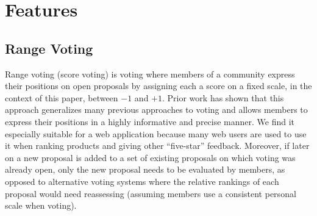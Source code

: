 \documentclass{sigchi}
\begin{document}
%
%
%
%
%

\section{Features}

\subsection{Range Voting}

Range voting (score voting) is voting where members of a community express their positions on open proposals by assigning
each a score on a fixed scale, in the context of this paper, between $-1$ and $+1$.
Prior work has shown that this approach generalizes many previous approaches to voting and allows members to express their
positions in a highly informative and precise manner.
We find it especially suitable for a web application because many web users are used to use it when ranking products
and giving other ``five-star'' feedback.
Moreover, if later on a new proposal is added to a set of existing proposals on which voting was already open, only the
new proposal needs to be evaluated by members, as opposed to alternative voting systems where the relative rankings of
each proposal would need reassessing (assuming members use a consistent personal scale when voting).
\end{document}
